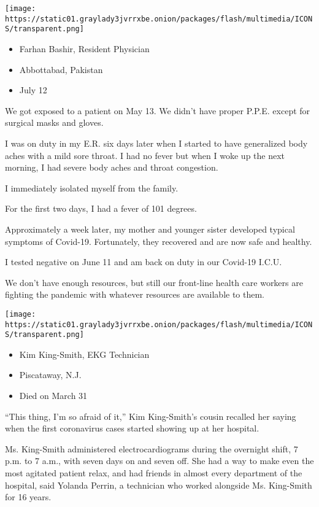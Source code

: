 \texttt{[image: https://static01.graylady3jvrrxbe.onion/packages/flash/multimedia/ICONS/transparent.png]}

\begin{itemize}
\tightlist
\item
  Farhan Bashir, Resident Physician
\item
  Abbottabad, Pakistan
\item
  July 12
\end{itemize}

We got exposed to a patient on May 13. We didn't have proper P.P.E.
except for surgical masks and gloves.

I was on duty in my E.R. six days later when I started to have
generalized body aches with a mild sore throat. I had no fever but when
I woke up the next morning, I had severe body aches and throat
congestion.

I immediately isolated myself from the family.

For the first two days, I had a fever of 101 degrees.

Approximately a week later, my mother and younger sister developed
typical symptoms of Covid-19. Fortunately, they recovered and are now
safe and healthy.

I tested negative on June 11 and am back on duty in our Covid-19 I.C.U.

We don't have enough resources, but still our front-line health care
workers are fighting the pandemic with whatever resources are available
to them.

\texttt{[image: https://static01.graylady3jvrrxbe.onion/packages/flash/multimedia/ICONS/transparent.png]}

\begin{itemize}
\tightlist
\item
  Kim King-Smith, EKG Technician
\item
  Piscataway, N.J.
\item
  Died on March 31
\end{itemize}

``This thing, I'm so afraid of it,'' Kim King-Smith's cousin recalled
her saying when the first coronavirus cases started showing up at her
hospital.

Ms. King-Smith administered electrocardiograms during the overnight
shift, 7 p.m. to 7 a.m., with seven days on and seven off. She had a way
to make even the most agitated patient relax, and had friends in almost
every department of the hospital, said Yolanda Perrin, a technician who
worked alongside Ms. King-Smith for 16 years.

